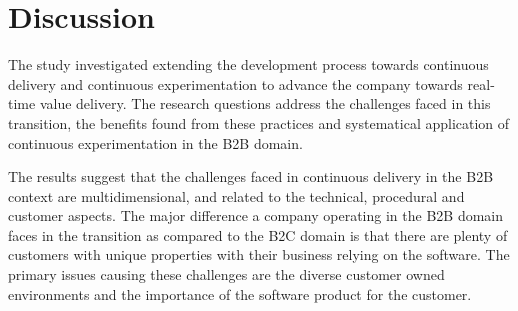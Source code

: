\documentclass[english]{tktltiki2}
\theoremstyle{definition}
\theoremstyle{remark}
\begin{document}




\section{Discussion}

The study investigated extending the development process towards continuous delivery and continuous experimentation to advance the company towards real-time value delivery. The research questions address the challenges faced in this transition, the benefits found from these practices and systematical application of continuous experimentation in the B2B domain. 


%



The results suggest that the challenges faced in continuous delivery in the B2B context are multidimensional, and related to the technical, procedural and customer aspects. The major difference a company operating in the B2B domain faces in the transition as compared to the B2C domain is that there are plenty of customers with unique properties with their business relying on the software. The primary issues causing these challenges are the diverse customer owned environments and the importance of the software product for the customer. 
\end{document}
